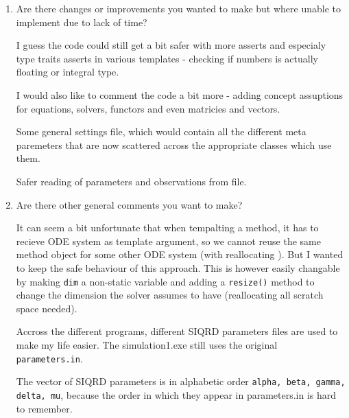 \documentclass[a4paper]{article}
\newcommand{\answer}[1]{\vspace{-0.75em}\begin{framed} #1 \end{framed}\vspace{-0.75em}}
\begin{document}
\begin{enumerate}
{\begin{itemize}
	\end{itemize}
}
	\item Are there changes or improvements you wanted to make but where unable to implement due to lack of time?
	\answer{
	I guess the code could still get a bit safer with more asserts and especialy type traits asserts in various templates - checking if numbers is actually floating or integral type.
	
	I would also like to comment the code a bit more - adding concept assuptions for equations, solvers, functors and even matricies and vectors.
	
	Some general settings file, which would contain all the different meta paremeters that are now scattered across the appropriate classes which use them.
	
	Safer reading of parameters and observations from file.
}
	\item Are there other general comments you want to make?
	\answer{
	It can seem a bit unfortunate that when tempalting a method, it has to recieve ODE system as template argument, so we cannot reuse the same method object for some other ODE system (with reallocating ). But I wanted to keep the safe behaviour of this approach. This is however easily changable by making \texttt{dim} a non-static variable and adding a \texttt{resize()} method to change the dimension the solver assumes to have (reallocating all scratch space needed).
	
	Accross the different programs, different SIQRD parameters files are used to make my life easier. The simulation1.exe still uses the original \texttt{parameters.in}.
	
	The vector of SIQRD parameters is in alphabetic order \texttt{alpha, beta, gamma, delta, mu}, because the order in which they appear in parameters.in is hard to remember.
}
\end{enumerate}
\end{document}
